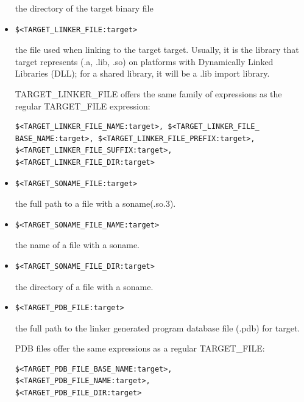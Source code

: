 \begin{itemize}
the directory of the target binary file

\item 
\begin{lstlisting}[style=styleCMake]
$<TARGET_LINKER_FILE:target>
\end{lstlisting}

the file used when linking to the target target. Usually, it is the library that target represents (.a, .lib, .so) on platforms with Dynamically Linked Libraries (DLL); for a shared library, it will be a .lib import library.

TARGET\_LINKER\_FILE offers the same family of expressions as the regular TARGET\_FILE expression:

\begin{lstlisting}[style=styleCMake]
$<TARGET_LINKER_FILE_NAME:target>, $<TARGET_LINKER_FILE_
BASE_NAME:target>, $<TARGET_LINKER_FILE_PREFIX:target>,
$<TARGET_LINKER_FILE_SUFFIX:target>,
$<TARGET_LINKER_FILE_DIR:target>
\end{lstlisting}

\item 
\begin{lstlisting}[style=styleCMake]
$<TARGET_SONAME_FILE:target>
\end{lstlisting}

the full path to a file with a soname(.so.3).

\item 
\begin{lstlisting}[style=styleCMake]
$<TARGET_SONAME_FILE_NAME:target>
\end{lstlisting}

the name of a file with a soname.

\item 
\begin{lstlisting}[style=styleCMake]
$<TARGET_SONAME_FILE_DIR:target> 
\end{lstlisting}

the directory of a file with a soname.

\item 
\begin{lstlisting}[style=styleCMake]
$<TARGET_PDB_FILE:target>
\end{lstlisting}

the full path to the linker generated program database file (.pdb) for target.

PDB files offer the same expressions as a regular TARGET\_FILE:

\begin{lstlisting}[style=styleCMake]
$<TARGET_PDB_FILE_BASE_NAME:target>, $<TARGET_PDB_FILE_NAME:target>,
$<TARGET_PDB_FILE_DIR:target>
\end{lstlisting}


\end{itemize}
